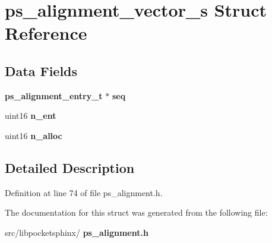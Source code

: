 \section{ps\+\_\+alignment\+\_\+vector\+\_\+s Struct Reference}
\label{structps__alignment__vector__s}
\subsection*{Data Fields}
\begin{DoxyCompactItemize}
\item 
\mbox{\label{structps__alignment__vector__s_a5bfae302b7ca4bddde35600d157bc2a2}} 
\textbf{ ps\+\_\+alignment\+\_\+entry\+\_\+t} $\ast$ {\bfseries seq}
\item 
\mbox{\label{structps__alignment__vector__s_ac45b2f21982334d415bed78abfeba66d}} 
uint16 {\bfseries n\+\_\+ent}
\item 
\mbox{\label{structps__alignment__vector__s_a18d4510d8a2495ac96bb0c295b725c83}} 
uint16 {\bfseries n\+\_\+alloc}
\end{DoxyCompactItemize}


\subsection{Detailed Description}


Definition at line 74 of file ps\+\_\+alignment.\+h.



The documentation for this struct was generated from the following file\+:\begin{DoxyCompactItemize}
\item 
src/libpocketsphinx/\textbf{ ps\+\_\+alignment.\+h}\end{DoxyCompactItemize}
